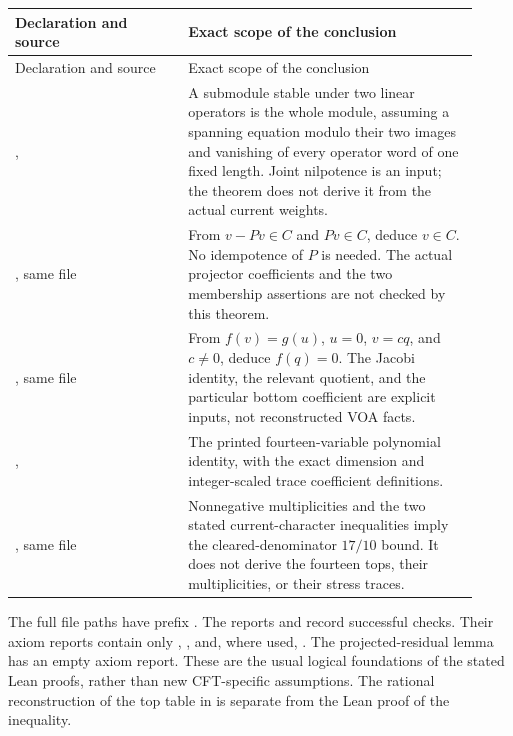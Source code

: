 \begin{longtable}{@{}P{0.34\linewidth}P{0.58\linewidth}@{}}
\toprule
Declaration and source & Exact scope of the conclusion\\
\midrule\endfirsthead
\toprule Declaration and source & Exact scope of the conclusion\\
\midrule\endhead
\bottomrule\endfoot
{},
& A submodule stable under two linear operators is the whole module,
assuming a spanning equation modulo their two images and vanishing of
every operator word of one fixed length. Joint nilpotence is an input;
the theorem does not derive it from the actual current weights.\\
, same file
& From $v-Pv\in C$ and $Pv\in C$, deduce $v\in C$.
No idempotence of $P$ is needed. The actual projector coefficients and
the two membership assertions are not checked by this theorem.\\
, same file
& From $f(v)=g(u)$, $u=0$, $v=cq$, and $c\ne0$, deduce $f(q)=0$.
The Jacobi identity, the relevant quotient, and the particular bottom
coefficient are explicit inputs, not reconstructed VOA facts.\\
,
& The printed fourteen-variable polynomial identity, with the exact
dimension and integer-scaled trace coefficient definitions.\\
, same file
& Nonnegative multiplicities and the two stated current-character
inequalities imply the cleared-denominator $17/10$ bound. It does not
derive the fourteen tops, their multiplicities, or their stress traces.\\
\end{longtable}

The full file paths have prefix .
The reports 
and  record successful
checks. Their axiom reports contain only ,
, and, where used, .
The projected-residual lemma has an empty axiom report. These are the
usual logical foundations of the stated Lean proofs, rather than new
CFT-specific assumptions. The rational reconstruction of the top table
in  is separate from
the Lean proof of the inequality.

